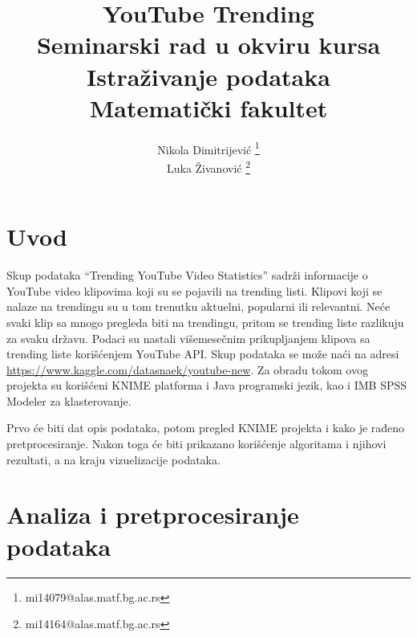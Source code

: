 \documentclass[a4paper]{article}
\theoremstyle{definition}
\begin{document}
\title{YouTube Trending\\ \small{Seminarski rad u okviru kursa\\Istraživanje podataka\\ Matematički fakultet}}

\author{Nikola Dimitrijević \footnote{mi14079@alas.matf.bg.ac.rs}\\
        Luka Živanović \footnote{mi14164@alas.matf.bg.ac.rs}\\
 }
\vspace*{-3cm}
    {\let\newpage\relax\maketitle}

\tableofcontents

\newpage



\section{Uvod}
\label{sec:uvod}
Skup podataka ``Trending YouTube Video Statistics'' sadrži informacije o YouTube video klipovima koji su se pojavili na trending listi.
Klipovi koji se nalaze na trendingu su u tom trenutku aktuelni, popularni ili relevantni. Neće svaki klip sa mnogo pregleda biti na trendingu,
 pritom se trending liste razlikuju za svaku državu. Podaci su nastali višemesečnim prikupljanjem klipova sa trending liste korišćenjem YouTube API.
Skup podataka se može naći na adresi \url{https://www.kaggle.com/datasnaek/youtube-new}.
Za obradu tokom ovog projekta su korišćeni KNIME platforma i Java programski jezik, kao i IMB SPSS Modeler za klasterovanje.

Prvo će biti dat opis podataka, potom pregled KNIME projekta i kako je rađeno pretprocesiranje. Nakon toga će biti prikazano korišćenje algoritama i njihovi rezultati, a na kraju
vizuelizacije podataka.
\section{Analiza i pretprocesiranje podataka}


\label{sec:analiza}
\end{document}
